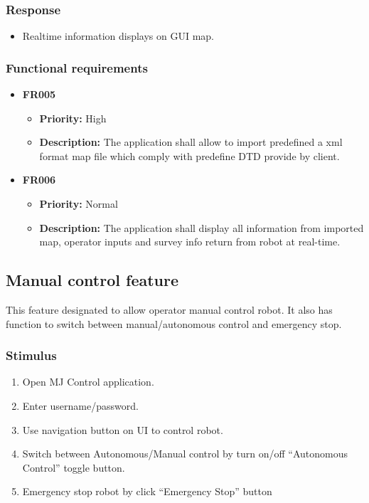 \documentclass[10pt,a4paper,titlepage]{article}
\begin{document}
	\subsubsection*{Response}
	\begin{itemize}
		\item Realtime information displays on GUI map.
	\end{itemize}
	
	\subsubsection*{Functional requirements}
	\begin{itemize}
		
		\item \textbf{FR005} 
		\begin{itemize}
			\item \textbf{Priority:} High
			\item \textbf{Description:} The application shall allow to import predefined a xml format map file which comply with predefine DTD provide by client.
		\end{itemize}
		\item \textbf{FR006} 
		\begin{itemize}
		\item \textbf{Priority:} Normal
		\item \textbf{Description:} The application shall display all information from imported map, operator inputs and survey info return from robot at real-time.
		\end{itemize}
	
	\end{itemize}
	
	\subsection{Manual control feature }
	This feature designated to allow operator manual control robot. It also has function to switch between manual/autonomous control and emergency stop.
	
	\subsubsection*{Stimulus}
	\begin{enumerate}
		\item Open MJ Control application.
		\item Enter username/password.
		\item Use navigation button on UI to control robot.
		\item Switch between Autonomous/Manual control by turn on/off “Autonomous Control” toggle button.
		\item Emergency stop robot by click “Emergency Stop” button
	\end{enumerate}
	
\end{document}
